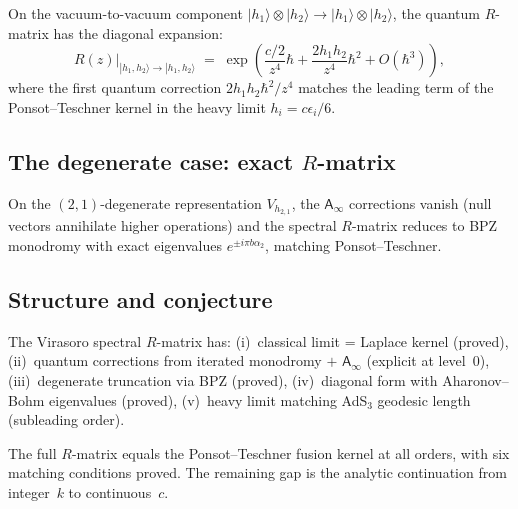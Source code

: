 \documentclass[11pt]{article}
\newcommand{\Ainf}{\mathsf{A}_{\infty}}
\begin{document}
\begin{proposition}
\label{prop:quantum-level0-R}
On the vacuum-to-vacuum component
$|h_1\rangle \otimes |h_2\rangle \to |h_1\rangle \otimes |h_2\rangle$,
the quantum $R$-matrix has the diagonal expansion:
\begin{equation}\label{eq:R-diagonal-level0-R}
R(z)\big|_{|h_1,h_2\rangle \to |h_1,h_2\rangle}
\;=\;
\exp\!\left(
  \frac{c/2}{z^4}\hbar
  + \frac{2h_1 h_2}{z^4}\hbar^2
  + O(\hbar^3)
\right),
\end{equation}
where the first quantum correction
$2h_1 h_2 \hbar^2/z^4$ matches the leading term of the
Ponsot--Teschner kernel in the heavy limit
$h_i = c\epsilon_i/6$.
\end{proposition}

\subsection{The degenerate case: exact $R$-matrix}
\label{subsec:degenerate-exact-R}

\begin{proposition}
\label{prop:degenerate-from-laplace-R}
On the $(2,1)$-degenerate representation $V_{h_{2,1}}$, the
$\Ainf$ corrections vanish (null vectors annihilate higher
operations) and the spectral $R$-matrix reduces to BPZ monodromy
with exact eigenvalues $e^{\pm i\pi b\alpha_2}$, matching
Ponsot--Teschner.
\end{proposition}

\subsection{Structure and conjecture}
\label{subsec:structure-conj-R}

\begin{theorem}
\label{thm:vir-R-structure-R}
The Virasoro spectral $R$-matrix has: (i)~classical limit = Laplace
kernel (proved), (ii)~quantum corrections from iterated monodromy $+$
$\Ainf$ (explicit at level~$0$), (iii)~degenerate truncation via BPZ
(proved), (iv)~diagonal form with Aharonov--Bohm eigenvalues (proved),
(v)~heavy limit matching AdS$_3$ geodesic length (subleading order).
\end{theorem}

\begin{conjecture}[Virasoro $R$-matrix $=$ Ponsot--Teschner]
\label{conj:R-PT-R}
The full $R$-matrix equals the Ponsot--Teschner fusion kernel at all
orders, with six matching conditions proved.  The remaining gap is the
analytic continuation from integer~$k$ to continuous~$c$.
\end{conjecture}
\end{document}
